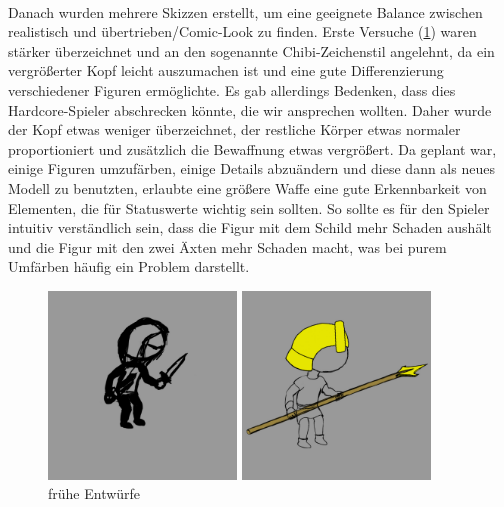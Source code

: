 \documentclass[extern,palatino]{cgBA}
\begin{document}
\\Danach wurden mehrere Skizzen erstellt, um eine geeignete Balance zwischen realistisch und übertrieben/Comic-Look zu finden. Erste Versuche (\ref{earlydesign}) waren stärker überzeichnet und an den sogenannte Chibi-Zeichenstil angelehnt, da ein vergrößerter Kopf leicht auszumachen ist und eine gute Differenzierung verschiedener Figuren ermöglichte. Es gab allerdings Bedenken, dass dies Hardcore-Spieler abschrecken könnte, die wir ansprechen wollten. Daher wurde der Kopf etwas weniger überzeichnet, der restliche Körper etwas normaler proportioniert und zusätzlich die Bewaffnung etwas vergrößert. Da geplant war, einige Figuren umzufärben, einige Details abzuändern und diese dann als neues Modell zu benutzten, erlaubte eine größere Waffe eine gute Erkennbarkeit von Elementen, die für Statuswerte wichtig sein sollten. So sollte es für den Spieler intuitiv verständlich sein, dass die Figur mit dem Schild mehr Schaden aushält und die Figur mit den zwei Äxten mehr Schaden macht, was bei purem Umfärben häufig ein Problem darstellt.
\begin{figure}
	\raggedleft
	\includegraphics[width=5cm]{assachibi.jpg}
	\raggedright
	\includegraphics[width=5cm]{egychibi.jpg}
	\caption{frühe Entwürfe}
	\label{earlydesign}
\end{figure}
\end{document}
